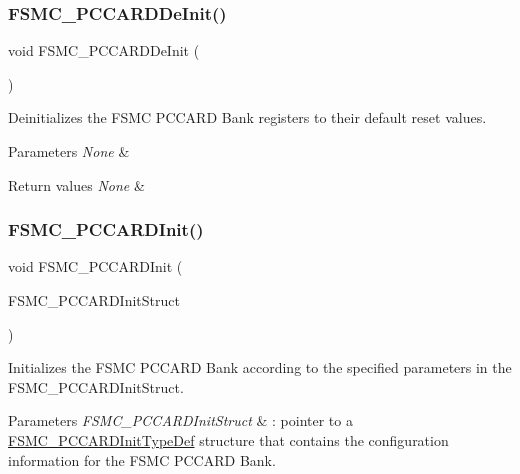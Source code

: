 \subsubsection{\texorpdfstring{FSMC\_PCCARDDeInit()}{FSMC\_PCCARDDeInit()}}
{\footnotesize\ttfamily void F\+S\+M\+C\+\_\+\+P\+C\+C\+A\+R\+D\+De\+Init (\begin{DoxyParamCaption}\item[{void}]{ }\end{DoxyParamCaption})}



Deinitializes the F\+S\+MC P\+C\+C\+A\+RD Bank registers to their default reset values. 


\begin{DoxyParams}{Parameters}
{\em None} & \\
\hline
\end{DoxyParams}

\begin{DoxyRetVals}{Return values}
{\em None} & \\
\hline
\end{DoxyRetVals}
\mbox{\label{group___f_s_m_c___private___functions_gacee1351363e7700a296faa1734a910aa}} 
\subsubsection{\texorpdfstring{FSMC\_PCCARDInit()}{FSMC\_PCCARDInit()}}
{\footnotesize\ttfamily void F\+S\+M\+C\+\_\+\+P\+C\+C\+A\+R\+D\+Init (\begin{DoxyParamCaption}\item[{\mbox{\hyperlink{struct_f_s_m_c___p_c_c_a_r_d_init_type_def}{F\+S\+M\+C\+\_\+\+P\+C\+C\+A\+R\+D\+Init\+Type\+Def}} $\ast$}]{F\+S\+M\+C\+\_\+\+P\+C\+C\+A\+R\+D\+Init\+Struct }\end{DoxyParamCaption})}



Initializes the F\+S\+MC P\+C\+C\+A\+RD Bank according to the specified parameters in the F\+S\+M\+C\+\_\+\+P\+C\+C\+A\+R\+D\+Init\+Struct. 


\begin{DoxyParams}{Parameters}
{\em F\+S\+M\+C\+\_\+\+P\+C\+C\+A\+R\+D\+Init\+Struct} & \+: pointer to a \mbox{\hyperlink{struct_f_s_m_c___p_c_c_a_r_d_init_type_def}{F\+S\+M\+C\+\_\+\+P\+C\+C\+A\+R\+D\+Init\+Type\+Def}} structure that contains the configuration information for the F\+S\+MC P\+C\+C\+A\+RD Bank.\\
\hline
\end{DoxyParams}

